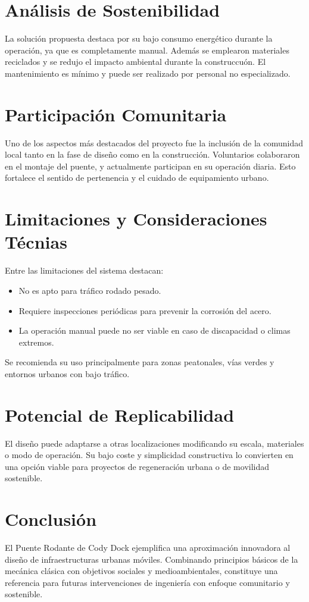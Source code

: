 \documentclass{IEEEtran}
\begin{document}
\section{Análisis de Sostenibilidad}
La solución propuesta destaca por su bajo consumo energético durante la operación, ya que es completamente manual. Además se emplearon materiales reciclados y se redujo el impacto ambiental durante la construccuón. El mantenimiento es mínimo y puede ser realizado por personal no especializado.

\section{Participación Comunitaria}
Uno de los aspectos más destacados del proyecto fue la inclusión de la comunidad local tanto en la fase de diseño como en la construcción. Voluntarios colaboraron en el montaje del puente, y actualmente participan en su operación diaria. Esto fortalece el sentido de pertenencia y el cuidado de equipamiento urbano.

\section{Limitaciones y Consideraciones Técnias}
Entre las limitaciones del sistema destacan:
\begin{itemize}
    \item No es apto para tráfico rodado pesado.
    \item Requiere inspecciones periódicas para prevenir la corrosión del acero.
    \item La operación manual puede no ser viable en caso de discapacidad o climas extremos.
\end{itemize}

Se recomienda su uso principalmente para zonas peatonales, vías verdes y entornos urbanos con bajo tráfico.

\section{Potencial de Replicabilidad}
El diseño puede adaptarse a otras localizaciones modificando su escala, materiales o modo de operación. Su bajo coste y simplicidad constructiva lo convierten en una opción viable para proyectos de regeneración urbana o de movilidad sostenible.

\section{Conclusión}
El Puente Rodante de Cody Dock ejemplifica una aproximación innovadora al diseño de infraestructuras urbanas móviles. Combinando principios básicos de la mecánica clásica con objetivos sociales y medioambientales, constituye una referencia para futuras intervenciones de ingeniería con enfoque comunitario y sostenible.

\nocite{*}
\printbibliography
\end{document}
